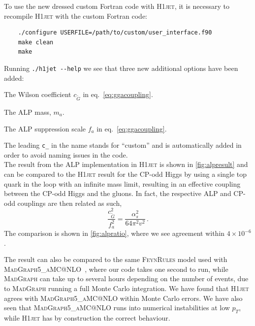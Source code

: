 \documentclass[12pt]{article}
\begin{document}
To use the new dressed custom Fortran code with \textsc{H1jet}, it is necessary to recompile \textsc{H1jet} with the custom Fortran code: 
\begin{lstlisting}
	./configure USERFILE=/path/to/custom/user_interface.f90 
	make clean
	make 
\end{lstlisting}
Running \texttt{./h1jet -{}-help} we see that three new additional options have been added: 
\begin{description}[labelindent=1cm, labelwidth =\widthof{\bfseries9999999999999999999999}, leftmargin = !] 
	\item[\texttt{-{}-c\_CGtil <value>}] The Wilson coefficient $c_{\tilde{G}}$ in eq.~\eqref{eq:ggacoupling}. 
	\item[\texttt{-{}-c\_mA <value>}] The ALP mass, $m_a$. 
	\item[\texttt{-{}-c\_fa <value>}] The ALP suppression scale $f_a$ in eq.~\eqref{eq:ggacoupling}. 
\end{description}
The leading \texttt{c\_} in the name stands for ``custom'' and is automatically added in order to avoid naming issues in the code. \\ 

The result from the ALP implementation in \textsc{H1jet} is shown in \autoref{fig:alpresult} and can be compared to the \textsc{H1jet} result for the CP-odd Higgs by using a single top quark in the loop with an infinite mass limit, resulting in an effective coupling between the CP-odd Higgs and the gluons. In fact, the respective ALP and CP-odd couplings are then related as such, 
\begin{equation}
	\frac{c_{\tilde{G}}^2}{f_a^2} = \frac{\alpha_s^2}{64 \pi^2 v^2} \,. 
\end{equation}
The comparison is shown in \autoref{fig:alpratio}, where we see agreement within $4\times 10^{-6}$. 

The result can also be compared to the same \textsc{FeynRules} model
used with \textsc{\linebreak MadGraph5\_aMC@NLO}~\cite{Alwall:2014hca}, where our
code takes one second to run, while \textsc{MadGraph} can take up to
several hours depending on the number of events, due to
\textsc{MadGraph} running a full Monte Carlo integration. We have
found that \textsc{H1jet} agrees with \textsc{MadGraph5\_aMC@NLO}
within Monte Carlo errors. We have also seen that
\textsc{MadGraph5\_aMC@NLO} runs into numerical instabilities at low
$p_T$, while \textsc{H1jet} has by construction the correct behaviour.
\end{document}
